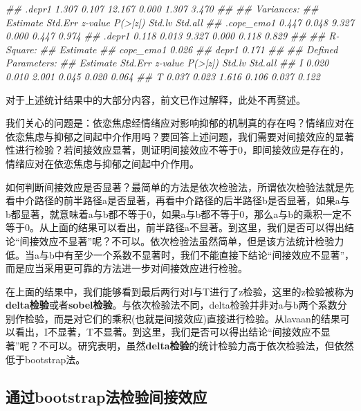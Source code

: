 \documentclass[
  chinese-hans,
  letterpaper,
  DIV=11,
  numbers=noendperiod]{scrartcl}
\newenvironment{Shaded}{\begin{snugshade}}{\end{snugshade}}
\newcommand{\DocumentationTok}[1]{\textcolor[rgb]{0.37,0.37,0.37}{\textit{#1}}}
\begin{document}
\begin{Shaded}
\begin{Highlighting}[numbers=left,,]
\DocumentationTok{\#\#    .depr1             1.307    0.107   12.167    0.000    1.307    3.470}
\DocumentationTok{\#\# }
\DocumentationTok{\#\# Variances:}
\DocumentationTok{\#\#                    Estimate  Std.Err  z{-}value  P(\textgreater{}|z|)   Std.lv  Std.all}
\DocumentationTok{\#\#    .cope\_emo1         0.447    0.048    9.327    0.000    0.447    0.974}
\DocumentationTok{\#\#    .depr1             0.118    0.013    9.327    0.000    0.118    0.829}
\DocumentationTok{\#\# }
\DocumentationTok{\#\# R{-}Square:}
\DocumentationTok{\#\#                    Estimate}
\DocumentationTok{\#\#     cope\_emo1         0.026}
\DocumentationTok{\#\#     depr1             0.171}
\DocumentationTok{\#\# }
\DocumentationTok{\#\# Defined Parameters:}
\DocumentationTok{\#\#                    Estimate  Std.Err  z{-}value  P(\textgreater{}|z|)   Std.lv  Std.all}
\DocumentationTok{\#\#     I                 0.020    0.010    2.001    0.045    0.020    0.064}
\DocumentationTok{\#\#     T                 0.037    0.023    1.616    0.106    0.037    0.122}
\end{Highlighting}
\end{Shaded}

对于上述统计结果中的大部分内容，前文已作过解释，此处不再赘述。

我们关心的问题是：依恋焦虑经情绪应对影响抑郁的机制真的存在吗？情绪应对在依恋焦虑与抑郁之间起中介作用吗？要回答上述问题，我们需要对间接效应的显著性进行检验？若间接效应显著，则证明间接效应不等于0，即间接效应是存在的，情绪应对在依恋焦虑与抑郁之间起中介作用。

如何判断间接效应是否显著？最简单的方法是依次检验法，所谓依次检验法就是先看中介路径的前半路径a是否显著，再看中介路径的后半路径b是否显著，如果a与b都显著，就意味着a与b都不等于0，如果a与b都不等于0，那么a与b的乘积一定不等于0。从上面的结果可以看出，前半路径a不显著。到这里，我们是否可以得出结论``间接效应不显著''呢？不可以。依次检验法虽然简单，但是该方法统计检验力低。当a与b中有至少一个系数不显著时，我们不能直接下结论``间接效应不显著''，而是应当采用更可靠的方法进一步对间接效应进行检验。

在上面的结果中，我们能够看到最后两行对I与T进行了z检验，这里的z检验被称为\textbf{delta检验}或者\textbf{sobel检验}。与依次检验法不同，delta检验并非对a与b两个系数分别作检验，而是对它们的乘积(也就是间接效应)直接进行检验。从lavaan的结果可以看出，I不显著，T不显著。到这里，我们是否可以得出结论``间接效应不显著''呢？不可以。研究表明，虽然\textbf{delta检验}的统计检验力高于依次检验法，但依然低于bootstrap法。

\subsection{通过bootstrap法检验间接效应}\label{ux901aux8fc7bootstrapux6cd5ux68c0ux9a8cux95f4ux63a5ux6548ux5e94}
\end{document}
